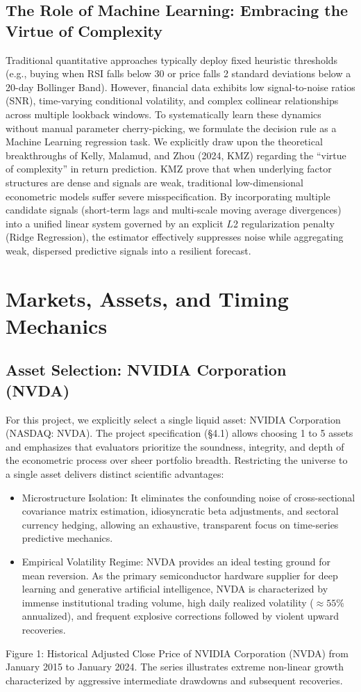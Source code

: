 \documentclass[12pt, a4paper]{article}
\begin{document}
\subsection{The Role of Machine Learning: Embracing the Virtue of Complexity}
Traditional quantitative approaches typically deploy fixed heuristic thresholds (e.g., buying when RSI 
falls below 30 or price falls 2 standard deviations below a 20-day Bollinger Band). However, financial 
data exhibits low signal-to-noise ratios (SNR), time-varying conditional volatility, and complex collinear 
relationships across multiple lookback windows.
To systematically learn these dynamics without manual parameter cherry-picking, we formulate the 
decision rule as a Machine Learning regression task. We explicitly draw upon the theoretical breakthroughs of Kelly, Malamud, and Zhou (2024, KMZ)  regarding the ``virtue of complexity'' in return 
prediction. KMZ prove that when underlying factor structures are dense and signals are weak, traditional low-dimensional econometric models suffer severe misspecification. By incorporating multiple 
candidate signals (short-term lags and multi-scale moving average divergences) into a unified linear 
system governed by an explicit $L$2 regularization penalty (Ridge Regression), the estimator effectively 
suppresses noise while aggregating weak, dispersed predictive signals into a resilient forecast.

\section{Markets, Assets, and Timing Mechanics}
\subsection{Asset Selection: NVIDIA Corporation (NVDA)}
For this project, we explicitly select a single liquid asset: NVIDIA Corporation (NASDAQ: NVDA). 
The project specification (§4.1) allows choosing 1 to 5 assets and emphasizes that evaluators prioritize 
the soundness, integrity, and depth of the econometric process over sheer portfolio breadth. Restricting 
the universe to a single asset delivers distinct scientific advantages:
\begin{itemize}
\item Microstructure Isolation: It eliminates the confounding noise of cross-sectional covariance matrix 
estimation, idiosyncratic beta adjustments, and sectoral currency hedging, allowing an exhaustive, 
transparent focus on time-series predictive mechanics.
\item Empirical Volatility Regime: NVDA provides an ideal testing ground for mean reversion. As the 
primary semiconductor hardware supplier for deep learning and generative artificial intelligence, 
NVDA is characterized by immense institutional trading volume, high daily realized volatility ($\approx 55\%$ 
annualized), and frequent explosive corrections followed by violent upward recoveries.
\end{itemize}
Figure 1: Historical Adjusted Close Price of NVIDIA Corporation (NVDA) from January 2015 to 
January 2024. The series illustrates extreme non-linear growth characterized by aggressive intermediate 
drawdowns and subsequent recoveries.
\end{document}
